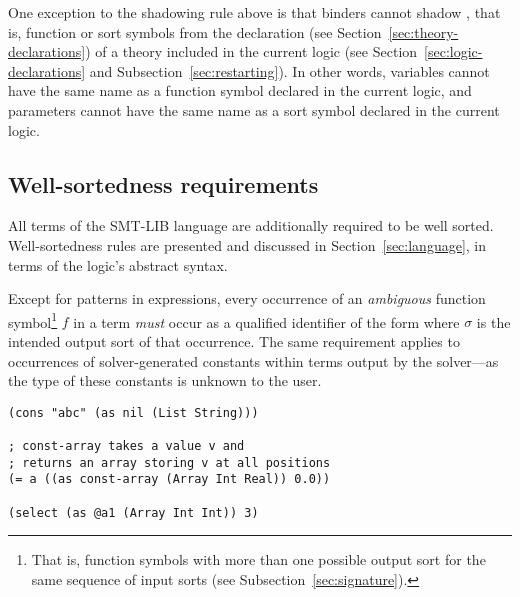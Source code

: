 \begin{remark}
One exception to the shadowing rule above is that binders cannot shadow ,
that is, function or sort symbols from the declaration 
(see Section~\ref{sec:theory-declarations})
of a theory included in the current logic
(see Section~\ref{sec:logic-declarations} and Subsection~\ref{sec:restarting}).
In other words, variables cannot have the same name 
as a function symbol declared in the current logic, and parameters
cannot have the same name as a sort symbol declared in the current logic.
\end{remark}

\subsection{Well-sortedness requirements} \label{well-sortedness}

All terms of the SMT-LIB language are additionally required to be well sorted.
Well-sortedness rules are presented and discussed in Section~\ref{sec:language},
in terms of the logic's abstract syntax.

Except for patterns in  expressions,
every occurrence of an \emph{ambiguous} function symbol\footnote{%
That is, function symbols with more than one possible output sort 
for the same sequence of input sorts (see Subsection~\ref{sec:signature}).
}
$f$ in a term \emph{must} occur as a qualified identifier of the form
 where $\sigma$ is the intended output sort
of that occurrence.
The same requirement applies to occurrences of solver-generated constants
within terms output by the solver---as the type of these constants is unknown
to the user.

\begin{lstlisting}[linewidth=32em]
(cons "abc" (as nil (List String)))

; const-array takes a value v and
; returns an array storing v at all positions
(= a ((as const-array (Array Int Real)) 0.0))

(select (as @a1 (Array Int Int)) 3)
\end{lstlisting}


